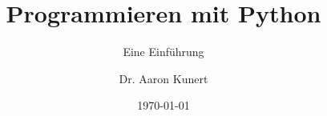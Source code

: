 \title{Programmieren mit Python}
\subtitle{Eine Einführung}
\date{\today}
\author{Dr. Aaron Kunert}
